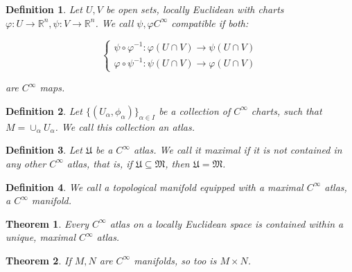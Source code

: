 \documentclass[10pt]{article}
\newtheorem{definition}{Definition}[section]
\newtheorem{theorem}{Theorem}[section]
\begin{document}
\begin{definition}
Let $U, V$ be open sets, locally Euclidean with charts $\varphi: U \to \mathbb{R}^n, \psi: V \to \mathbb{R}^n$. We call $\psi, \varphi C^\infty$ compatible if both:

$$\begin{cases} \psi \circ \varphi^{-1}: \varphi(U \cap V) \to \psi(U \cap V)\\  \varphi \circ \psi^{-1}: \psi(U \cap V) \to \varphi(U \cap V) \end{cases}$$

are $C^\infty$ maps.
\end{definition}

\begin{definition}
Let $\{ (U_\alpha, \phi_\alpha) \}_{\alpha \in I}$ be a collection of $C^\infty$ charts, such that $M = \cup_\alpha U_\alpha$. We call this collection an atlas.

\end{definition}

\begin{definition}
Let $\mathfrak{U}$ be a $C^\infty$ atlas. We call it maximal if it is not contained in any other $C^\infty $ atlas, that is, if $\mathfrak{U} \subseteq \mathfrak{M}$, then $\mathfrak{U} = \mathfrak{M}$.

\end{definition}

\begin{definition}
We call a topological manifold equipped with a maximal $C^\infty$ atlas, a $C^\infty$ manifold.
\end{definition}

\begin{theorem}
Every $C^\infty$ atlas on a locally Euclidean space is contained within a unique, maximal $C^\infty$ atlas.
\end{theorem}

\begin{theorem}
If $M, N$ are $C^\infty$ manifolds, so too is $M \times N$.

\end{theorem}
\end{document}
